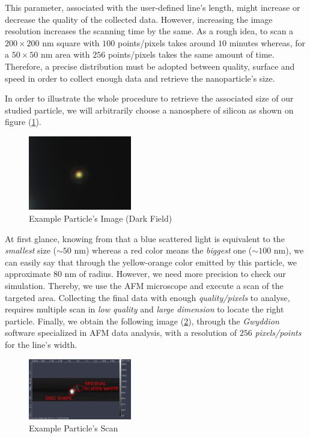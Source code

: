 \documentclass{article}
\numberwithin{equation}{section}
\begin{document}
This parameter, associated with the user-defined line's length, might increase or decrease the quality of the collected data. However, increasing the image resolution increases the scanning time by the same. As a rough idea, to scan a $200 \times 200$ nm square with $100$ points/pixels takes around $10$ minutes whereas, for a $50 \times 50$ nm area with $256$ points/pixels takes the same amount of time. Therefore, a precise distribution must be adopted between quality, surface and speed in order to collect enough data and retrieve the nanoparticle's size.

In order to illustrate the whole procedure to retrieve the associated size of our studied particle, we will arbitrarily choose a nanosphere of silicon as shown on figure (\ref{fig:gwyddion_df_ex}).
\begin{figure}[h!]
    \centering
    \includegraphics[width=0.4\textwidth, height=0.32\textwidth]{gwyddion_df_ex.png}
    \caption{Example Particle's Image (Dark Field)}
    \label{fig:gwyddion_df_ex}
\end{figure}
At first glance, knowing from \cite{arseniyandreymarkyuriboris} that a blue scattered light is equivalent to the \textit{smallest} size ($\sim 50$ nm) whereas a red color means the \textit{biggest} one ($\sim 100$ nm), we can easily say that through the yellow-orange color emitted by this particle, we approximate $80$ nm of radius. However, we need more precision to check our simulation. Thereby, we use the AFM microscope and execute a scan of the targeted area. Collecting the final data with enough \textit{quality/pixels} to analyse, requires multiple scan in \textit{low quality} and \textit{large dimension} to locate the right particle. Finally, we obtain the following image (\ref{fig:gwyddion_scan_ex}), through the \textit{Gwyddion} software specialized in AFM data analysis, with a resolution of $256$ \textit{pixels/points} for the line's width.
\begin{figure}[h!]
    \centering
    \includegraphics[width=0.40\textwidth, height=0.30\textwidth]{gwyddion_scan_ex.png}
    \caption{Example Particle's Scan}
    \label{fig:gwyddion_scan_ex}
\end{figure}
\end{document}
